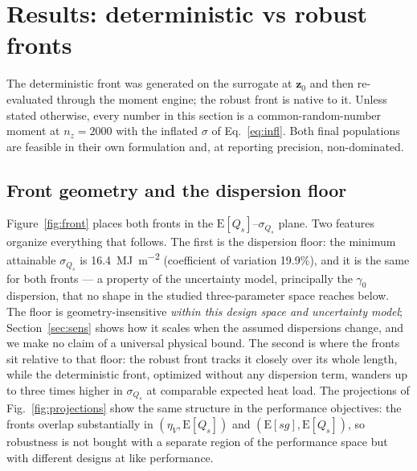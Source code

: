 \section{Results: deterministic vs robust fronts}
\label{sec:results}

The deterministic front was generated on the surrogate at $\mathbf{z}_0$ and
then re-evaluated through the moment engine; the robust front is native to
it. Unless stated otherwise, every number in this section is a
common-random-number moment at $n_z=2000$ with the inflated $\sigma$ of
Eq.~\eqref{eq:infl}. Both final populations are feasible in their own
formulation and, at reporting precision, non-dominated.

\subsection{Front geometry and the dispersion floor}
\label{sec:fronts}

Figure~\ref{fig:front} places both fronts in the
$\mathrm{E}[Q_s]$--$\sigma_{Q_s}$ plane. Two features organize everything
that follows. The first is the dispersion floor: the minimum attainable
$\sigma_{Q_s}$ is \SI{16.4}{\mega\joule\per\square\metre} (coefficient of
variation 19.9\%), and it is the same for both fronts --- a property of
the uncertainty model, principally the $\gamma_0$ dispersion, that no
shape in the studied three-parameter space reaches below. The floor is
geometry-insensitive \emph{within this design space and uncertainty
model}; Section~\ref{sec:sens} shows how it scales when the assumed
dispersions change, and we make no claim of a universal physical bound. The second is where the fronts sit relative
to that floor: the robust front tracks it closely over its whole length,
while the deterministic front, optimized without any dispersion term,
wanders up to three times higher in $\sigma_{Q_s}$ at comparable expected
heat load. The projections of Fig.~\ref{fig:projections} show the same
structure in the performance objectives: the fronts overlap substantially
in $(\eta_V,\mathrm{E}[Q_s])$ and $(\mathrm{E}[sg],\mathrm{E}[Q_s])$, so
robustness is not bought with a separate region of the performance space
but with different designs at like performance.

